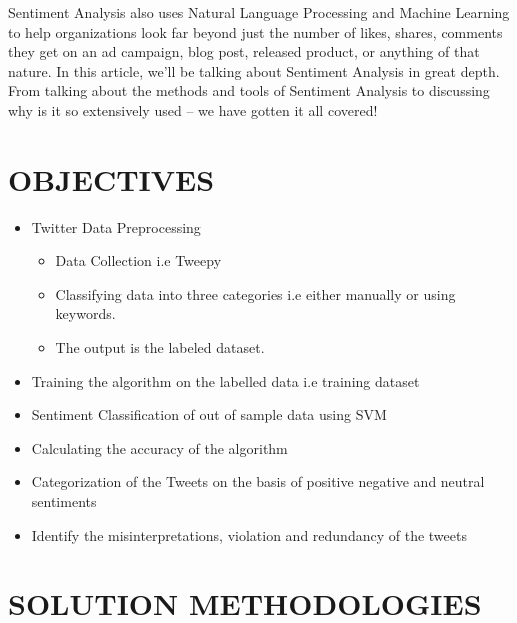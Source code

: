 \documentclass[preprint,12pt]{elsarticle}
\begin{document}
Sentiment Analysis also uses Natural Language Processing and Machine Learning to help organizations look far beyond just the number of likes, shares, comments they get on an ad campaign, blog post, released product, or anything of that nature. In this article, we’ll be talking about Sentiment Analysis in great depth. From talking about the methods and tools of Sentiment Analysis to discussing why is it so extensively used – we have gotten it all covered!\\



\section{OBJECTIVES}
\label{S:1}

\begin{itemize}
\item Twitter Data Preprocessing
\begin{itemize}
\item Data Collection i.e Tweepy
\item Classifying data into three categories i.e either manually or using keywords.
\item The output is the labeled dataset.
\end{itemize}
\item Training the algorithm on the labelled data i.e training dataset
\item Sentiment Classification of out of sample data using SVM
\item Calculating the accuracy of the algorithm
\item Categorization of the Tweets on the basis of positive negative and neutral sentiments
\item Identify the misinterpretations, violation and redundancy of the tweets \\
\end{itemize}

\section{SOLUTION METHODOLOGIES}
\label{S:1}
\end{document}
